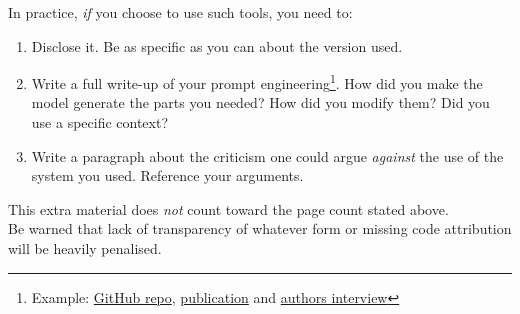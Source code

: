 \documentclass{labo}
\begin{document}
In practice, \textit{if} you choose to use such tools, you need to:
\begin{enumerate}
	\item Disclose it. Be as specific as you can about the version used.
	\item Write a full write-up of your prompt engineering\footnote{Example: \href{https://github.com/JBlocklove/tt03-qtchallenges-chatgpt_4}{GitHub repo}, \href{https://arxiv.org/abs/2305.13243}{publication} and \href{https://www.youtube.com/watch?v=6vC3t_soJok}{authors interview}}. How did you make the model generate the parts you needed? How did you modify them? Did you use a specific context?
	\item Write a paragraph about the criticism one could argue \textit{against} the use of the system you used. Reference your arguments.
\end{enumerate}
This extra material does \textit{not} count toward the page count stated above.\\

Be warned that lack of transparency of whatever form or missing code attribution will be heavily penalised.
\end{document}
